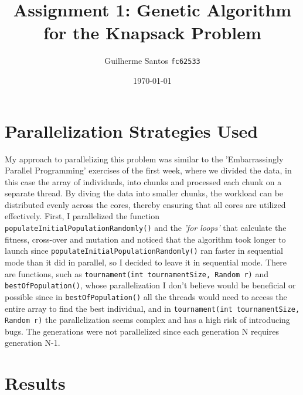 \documentclass[11pt]{report}
\title{Assignment 1: Genetic Algorithm for the Knapsack Problem}
\author{Guilherme Santos \texttt{fc62533}}
\date{\today}
\begin{document}
\maketitle

\section*{Parallelization Strategies Used}
My approach to parallelizing this problem was similar to the
'Embarrassingly Parallel Programming' exercises of the first week, where we divided the data, in this case the array of individuals, into chunks and processed each chunk on a separate thread.
By diving the data into smaller chunks, the workload can be distributed evenly across the cores, thereby ensuring that all cores are utilized effectively.
First, I parallelized the function \texttt{populateInitialPopulationRandomly()} and the \textit{'for loops'} that calculate the fitness, cross-over and mutation and noticed that the algorithm took longer to launch since \texttt{populateInitialPopulationRandomly()} ran faster in sequential mode than it did in parallel, 
so I decided to leave it in sequential mode.
There are functions, such as \texttt{tournament(int tournamentSize, Random r)} and \texttt{bestOfPopulation()}, whose parallelization I don't believe would be beneficial 
or possible since in \texttt{bestOfPopulation()} all the threads would need to access the entire array to find the best individual, 
and in \texttt{tournament(int tournamentSize, Random r)} the parallelization seems complex and has a high risk of introducing bugs.
The generations were not parallelized since each generation N requires generation N-1.

\section*{Results}
\end{document}
